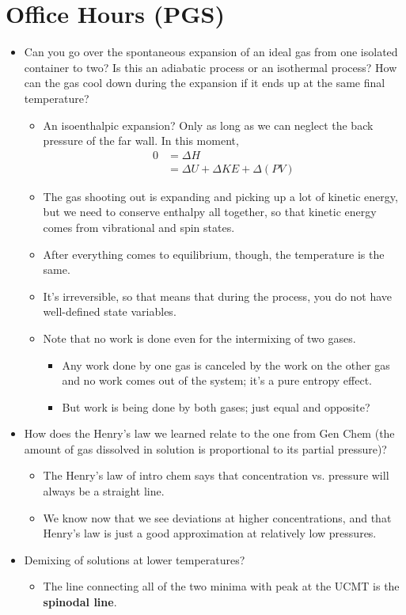 \documentclass[../notes.tex]{subfiles}
\begin{document}
\section{Office Hours (PGS)}
\begin{itemize}
    \item Can you go over the spontaneous expansion of an ideal gas from one isolated container to two? Is this an adiabatic process or an isothermal process? How can the gas cool down during the expansion if it ends up at the same final temperature?
    \begin{itemize}
        \item An isoenthalpic expansion? Only as long as we can neglect the back pressure of the far wall. In this moment,
        \begin{align*}
            0 &= \Delta H\\
            &= \Delta U+\Delta KE+\Delta(PV)
        \end{align*}
        \item The gas shooting out is expanding and picking up a lot of kinetic energy, but we need to conserve enthalpy all together, so that kinetic energy comes from vibrational and spin states.
        \item After everything comes to equilibrium, though, the temperature is the same.
        \item It's irreversible, so that means that during the process, you do not have well-defined state variables.
        \item Note that no work is done even for the intermixing of two gases.
        \begin{itemize}
            \item Any work done by one gas is canceled by the work on the other gas and no work comes out of the system; it's a pure entropy effect.
            \item But work is being done by both gases; just equal and opposite?
        \end{itemize}
    \end{itemize}
    \item How does the Henry's law we learned relate to the one from Gen Chem (the amount of gas dissolved in solution is proportional to its partial pressure)?
    \begin{itemize}
        \item The Henry's law of intro chem says that concentration vs. pressure will always be a straight line.
        \item We know now that we see deviations at higher concentrations, and that Henry's law is just a good approximation at relatively low pressures.
    \end{itemize}
    \item Demixing of solutions at lower temperatures?
    \begin{itemize}
        \item The line connecting all of the two minima with peak at the UCMT is the \textbf{spinodal line}.
    \end{itemize}
\end{itemize}
\end{document}
